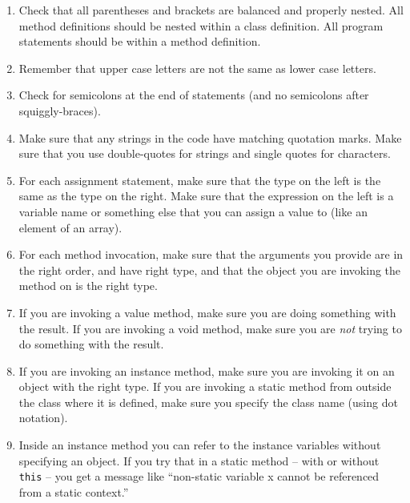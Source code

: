 \documentclass[12pt]{book}
\theoremstyle{exercise}
\newcommand{\java}[1]{\verb"#1"}
\begin{document}
\begin{enumerate}

\item Check that all parentheses and brackets are balanced and properly nested.
All method definitions should be nested within a class definition.
All program statements should be within a method definition.

\item Remember that upper case letters are not the same as lower case letters.

\item Check for semicolons at the end of statements (and no semicolons after squiggly-braces).

\item Make sure that any strings in the code have matching quotation marks.
Make sure that you use double-quotes for strings and single quotes for characters.

\item For each assignment statement, make sure that the type on the left is the same as the type on the right.
Make sure that the expression on the left is a variable name or something else that you can assign a value to (like an element of an array).

\item For each method invocation, make sure that the arguments you provide are in the right order, and have right type, and that the object you are invoking the method on is the right type.

\item If you are invoking a value method, make sure you are doing something with the result.
If you are invoking a void method, make sure you are {\em not} trying to do something with the result.

\item If you are invoking an instance method, make sure you are invoking it on an object with the right type.
If you are invoking a static method from outside the class where it is defined, make sure you specify the class name (using dot notation).

\item Inside an instance method you can refer to the instance variables without specifying an object.
If you try that in a static method -- with or without \java{this} -- you get a message like ``non-static variable x cannot be referenced from a static context.''

\end{enumerate}
\end{document}

